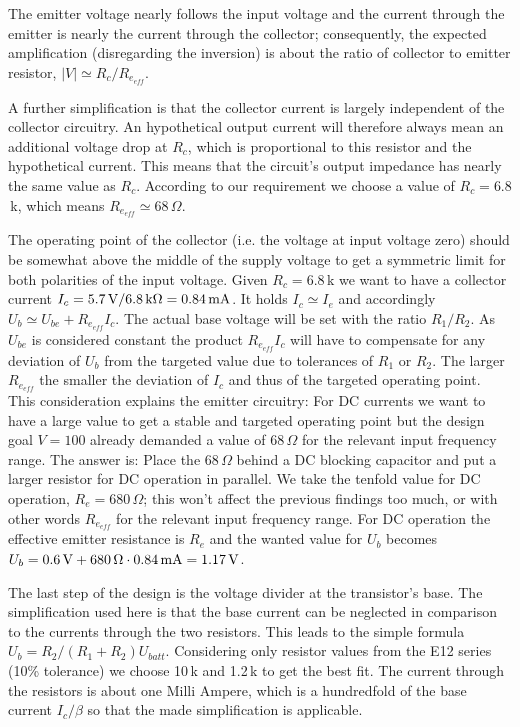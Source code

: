 The emitter voltage nearly follows the input voltage and the current
through the emitter is nearly the current through the collector;
consequently, the expected amplification (disregarding the inversion) is
about the ratio of collector to emitter resistor,
$\left| V \right| \simeq R_c/R_{e_{eff}}$.

A further simplification is that the collector current is largely
independent of the collector circuitry. An hypothetical output current
will therefore always mean an additional voltage drop at $R_c$, which is
proportional to this resistor and the hypothetical current. This means
that the circuit's output impedance has nearly the same value as $R_c$.
According to our requirement we choose a value of $R_c=6.8$\,k, which
means $R_{e_{eff}} \simeq 68\,\Omega$.

The operating point of the collector (i.e. the voltage at input voltage
zero) should be somewhat above the middle of the supply voltage to get a
symmetric limit for both polarities of the input voltage. Given $R_c=6.8$\,k
we want to have a collector current
$I_c=5.7\text{\,V}/6.8\text{\,k}\Omega=0.84\text{\,mA}$. It holds
$I_c \simeq I_e$ and accordingly $U_b \simeq U_{be} + R_{e_{eff}} I_c$.
The actual base voltage will be set with the ratio $R_1/R_2$. As $U_{be}$
is considered constant the product $R_{e_{eff}} I_c$ will have to
compensate for any deviation of $U_b$ from the targeted value due to
tolerances of $R_1$ or $R_2$. The larger $R_{e_{eff}}$ the smaller the
deviation of $I_c$ and thus of the targeted operating point.
This consideration explains the emitter circuitry: For DC currents we want
to have a large value to get a stable and targeted operating point but the
design goal $V=100$ already demanded a value of 68\,$\Omega$ for the
relevant input frequency range. The answer is: Place the 68\,$\Omega$ behind
a DC blocking capacitor and put a larger resistor for DC operation in
parallel. We take the tenfold value for DC operation, $R_e=680\,\Omega$;
this won't affect the previous findings too much, or with other words
$R_{e_{eff}}$ for the relevant input frequency range. For DC operation the
effective emitter resistance is $R_e$ and the wanted value for $U_b$ becomes 
$U_b=0.6\text{\,V}+680\text{\,}\Omega \cdot 0.84\text{\,mA}=1.17\text{\,V}$.

The last step of the design is the voltage divider at the transistor's
base. The simplification used here is that the base current can be
neglected in comparison to the currents through the two resistors. This
leads to the simple formula $U_b = R_2/(R_1+R_2) U_{batt}$. Considering
only resistor values from the E12 series (10\% tolerance) we choose 10\,k
and 1.2\,k to get the best fit. The current through the resistors is about
one Milli Ampere, which is a hundredfold of the base current $I_c/\beta$ so
that the made simplification is applicable.


